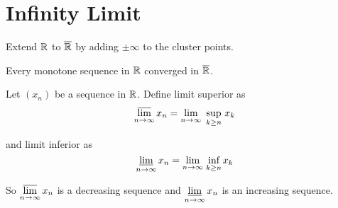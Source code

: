 \section{Infinity Limit}

Extend $\mathbb{R}$ to $\overline{\mathbb{R}}$ by adding $\pm \infty$ to the cluster points.

\begin{theorem}
    Every monotone sequence in $\mathbb{R}$ converged in $\overline{\mathbb{R}}$.
\end{theorem}


\begin{definition}
    Let $(x_n)$ be a sequence in $\mathbb{R}$. Define limit superior as
    \begin{equation}
        \varlimsup_{n\rightarrow \infty} x_n = \lim_{n \rightarrow \infty} \underset{k \geq n}{\text{ sup }} x_k
    \end{equation}
    
    and limit inferior as
    \begin{equation}
        \varliminf_{n\rightarrow \infty} x_n = \lim_{n \rightarrow \infty} \underset{k \geq n}{\text{ inf }} x_k
    \end{equation}    
    
    So $\displaystyle \varlimsup_{n\rightarrow \infty} x_n$ is a decreasing sequence and $\displaystyle \varliminf_{n\rightarrow \infty} x_n$ is an increasing sequence.
\end{definition}

